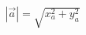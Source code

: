 \documentclass[preview]{standalone}
\begin{document}
\begin{align*}
|\vec{a}| = \sqrt{ x_a^2 + y_a^2 }
\end{align*}
\end{document}

